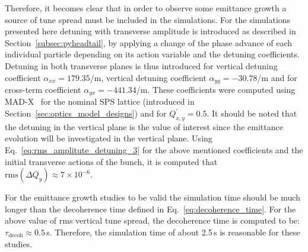 Therefore, it becomes clear that in order to observe some emittance growth a source of tune spread must be included in the simulations. For the simulations presented here detuning with transverse amplitude is introduced as described in Section~\ref{subsec:pyheadtail}, by applying a change of the phase advance of each individual particle depending on its action variable and the detuning coefficients. Detuning in both transverse planes is thus introduced for vertical detuning coefficient $\alpha_{xx}=179.35$/m, vertical detuning coefficient $\alpha_{yy}=-30.78$/m and for cross-term coefficient $\alpha_{yx}=-441.34$/m. These coefficients were computed using MAD-X~\cite{madx} for the nominal SPS lattice (introduced in Section~\ref{sec:optics_model_designs}) and for $Q^\prime_{x,y}=0.5$. It should be noted that the detuning in the vertical plane is the value of interest since the emittance evolution will be investigated in the vertical plane. Using Eq.~\eqref{eq:rms_amplitute_detuning_3} for the above mentioned coefficients and the initial transverse actions of the bunch, it is computed that $\mathrm{rms}(\Delta Q_y)\approx 7 \times 10^{-6}$. 

For the emittance growth studies to be valid the simulation time should be much longer than the decoherence time defined in Eq.~\eqref{eq:decoherence_time}. For the above value of rms vertical tune spread, the decoherence time is computed to be: $\tau_\mathrm{decoh} \approx 0.5$\,s. Therefore, the simulation time of about 2.5\,s is reasonable for these studies.


